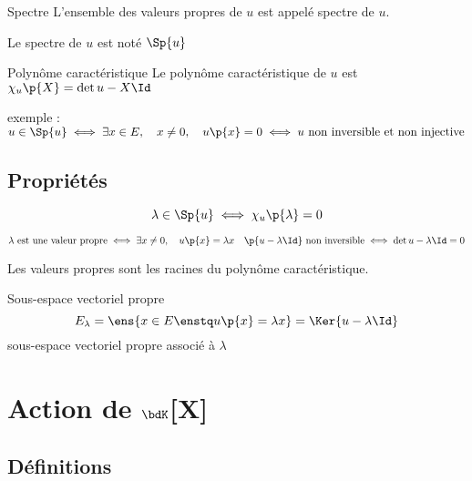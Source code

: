 \documentclass[a4paper,french,bookmarks]{book}
\begin{document}
    \begin{definition}{Spectre}
        L'ensemble des valeurs propres de $u$ est appelé spectre de $u$.
    \end{definition}
    
    \begin{notation}
        Le spectre de $u$ est noté $\Sp{u}$
    \end{notation}
    
    \begin{definition}{Polynôme caractéristique}{}
        Le polynôme caractéristique de $u$ est $\chi_u\p{X} = \det{u - X\Id}$
    \end{definition}
    
    exemple : $u \in \Sp{u} \iff \exists x \in E,\quad x \neq 0,\quad u\p{x} = 0\iff u \ \text{non inversible et non injective}$
    
    \subsection{Propriétés}
    
    \begin{property}{}{}
        \[ \lambda \in \Sp{u} \iff \chi_u\p{\lambda} = 0\]
    \end{property}
    \begin{nproof}
        \[ \lambda \ \text{est une valeur propre} \iff \exists x \neq 0,\quad u\p{x} = \lambda x \quad \p{u - \lambda \Id} \ \text{non inversible} \iff \det{u - \lambda \Id} = 0\]
    \end{nproof}
    
    \begin{property}{}{}
        Les valeurs propres sont les racines du polynôme caractéristique.
    \end{property}
    
    \begin{definition}{Sous-espace vectoriel propre}{}
        \[ E_\lambda = \ens{x \in E \enstq u\p{x} = \lambda x} = \Ker{u - \lambda \Id}\]
        sous-espace vectoriel propre associé à $\lambda$
    \end{definition}
    
    \section{Action de $\bdK$[X]}
    
    \subsection{Définitions}
    
\end{document}
